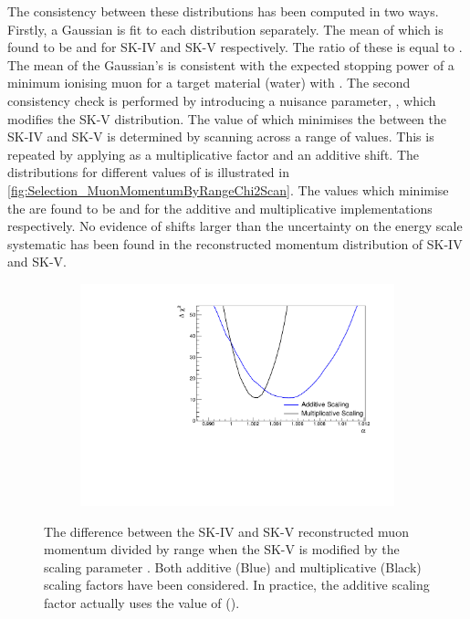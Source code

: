 The consistency between these distributions has been computed in two ways. Firstly, a Gaussian is fit to each distribution separately. The mean of which is found to be  and  for SK-IV and SK-V respectively. The ratio of these is equal to . The mean of the Gaussian's is consistent with the expected stopping power of a minimum ionising muon for a target material (water) with  \cite{PhysRevD.86.010001}. The second consistency check is performed by introducing a nuisance parameter, \quickmath{\alpha}, which modifies the SK-V distribution. The value of \quickmath{\alpha} which minimises the  between the SK-IV and SK-V is determined by scanning across a range of values. This is repeated by applying \quickmath{\alpha} as a multiplicative factor and an additive shift. The  distributions for different values of \quickmath{\alpha} is illustrated in \autoref{fig:Selection_MuonMomentumByRangeChi2Scan}. The values which minimise the  are found to be  and  for the additive and multiplicative implementations respectively. No evidence of shifts larger than the  uncertainty on the energy scale systematic has been found in the reconstructed momentum distribution of SK-IV and SK-V.

\begin{figure}[h]
  \begin{subfigure}[t]{\textwidth}
    \includegraphics[width=\textwidth, trim={0mm 0mm 0mm 0mm}, clip, page=1]{Figures/Selections/MuonRange_Chi2Scan.pdf}
  \end{subfigure}
  \caption{The  difference between the SK-IV and SK-V reconstructed muon momentum divided by range when the SK-V is modified by the scaling parameter \quickmath{\alpha}. Both additive (Blue) and multiplicative (Black) scaling factors have been considered. In practice, the additive scaling factor actually uses the value of ().}
  \label{fig:Selection_MuonMomentumByRangeChi2Scan}
\end{figure}

